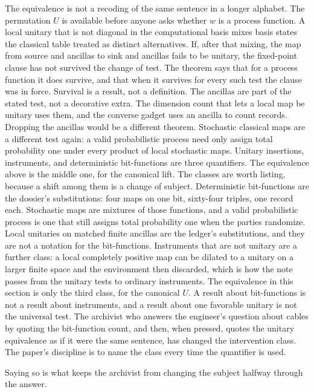 \documentclass[11pt]{article}
\begin{document}
The equivalence is not a recoding of the same sentence in a longer alphabet. The permutation \(U\) is available before anyone asks whether \(w\) is a process function. A local unitary that is not diagonal in the computational basis mixes basis states the classical table treated as distinct alternatives. If, after that mixing, the map from source and ancillas to sink and ancillas fails to be unitary, the fixed-point clause has not survived the change of test. The theorem says that for a process function it does survive, and that when it survives for every such test the clause was in force. Survival is a result, not a definition. The ancillas are part of the stated test, not a decorative extra. The dimension count that lets a local map be unitary uses them, and the converse gadget uses an ancilla to count records. Dropping the ancillas would be a different theorem. Stochastic classical maps are a different test again: a valid probabilistic process need only assign total probability one under every product of local stochastic maps. Unitary insertions, instruments, and deterministic bit-functions are three quantifiers. The equivalence above is the middle one, for the canonical lift. The classes are worth listing, because a shift among them is a change of subject. Deterministic bit-functions are the dossier’s substitutions: four maps on one bit, sixty-four triples, one record each. Stochastic maps are mixtures of those functions, and a valid probabilistic process is one that still assigns total probability one when the parties randomize. Local unitaries on matched finite ancillas are the ledger’s substitutions, and they are not a notation for the bit-functions. Instruments that are not unitary are a further class: a local completely positive map can be dilated to a unitary on a larger finite space and the environment then discarded, which is how the note passes from the unitary tests to ordinary instruments. The equivalence in this section is only the third class, for the canonical \(U\). A result about bit-functions is not a result about instruments, and a result about one favorable unitary is not the universal test. The archivist who answers the engineer’s question about cables by quoting the bit-function count, and then, when pressed, quotes the unitary equivalence as if it were the same sentence, has changed the intervention class. The paper’s discipline is to name the class every time the quantifier is used.

Saying so is what keeps the archivist from changing the subject halfway through the answer.
\end{document}
